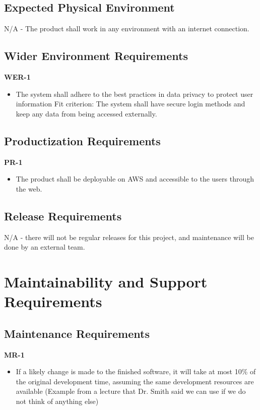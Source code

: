 \documentclass[12pt]{article}
\begin{document}
\subsection{Expected Physical Environment}
N/A - The product shall work in any environment with an internet connection.

\subsection{Wider Environment Requirements}

\textbf{WER-1}
\begin{itemize}
    \item The system shall adhere to the best practices in data privacy to protect user information \hfill \break
    Fit criterion: The system shall have secure login methods and keep any data from being accessed externally.
\end{itemize}

\subsection{Productization Requirements}
\textbf{PR-1}
\begin{itemize}
    \item The product shall be deployable on AWS and accessible to the users through the web.
\end{itemize}

\subsection{Release Requirements}
N/A - there will not be regular releases for this project, and maintenance will be done by an external team.

\section{Maintainability and Support Requirements}
\subsection{Maintenance Requirements}
\textbf{MR-1}
\begin{itemize}
    \item If a likely change is made to the finished software, it will take at most 10\% of the original development time, assuming the same development resources are available (Example from a lecture that Dr. Smith said we can use if we do not think of anything else)
\end{itemize}
\end{document}
